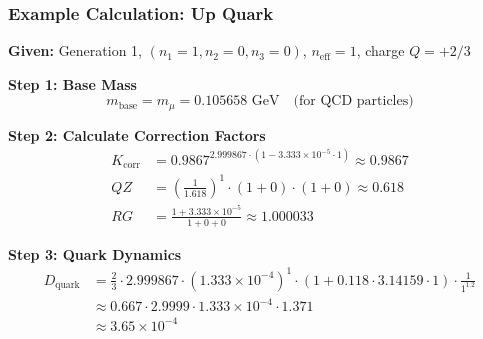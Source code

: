 	\begin{table}[h]
		\centering
		\small
		\caption{Quantum numbers systematics in the fractal method}
		\label{tab:qn_fractal}
	\end{table}
	
	\subsubsection{Example Calculation: Up Quark}
	
	\textbf{Given:} Generation 1, $(n_1=1, n_2=0, n_3=0)$, $n_{\text{eff}}=1$, charge $Q=+2/3$
	
	\textbf{Step 1: Base Mass}
	\begin{equation}
		m_{\text{base}} = m_\mu = 0.105658 \text{ GeV} \quad \text{(for QCD particles)}
	\end{equation}
	
	\textbf{Step 2: Calculate Correction Factors}
	\begin{align}
		K_{\text{corr}} &= 0.9867^{2.999867 \cdot (1 - 3.333 \times 10^{-5} \cdot 1)} \approx 0.9867 \\
		QZ &= \left(\frac{1}{1.618}\right)^1 \cdot (1 + 0) \cdot (1 + 0) \approx 0.618 \\
		RG &= \frac{1 + 3.333 \times 10^{-5}}{1 + 0 + 0} \approx 1.000033
	\end{align}
	
	\textbf{Step 3: Quark Dynamics}
	\begin{align}
		D_{\text{quark}} &= \frac{2}{3} \cdot 2.999867 \cdot (1.333 \times 10^{-4})^1 \cdot (1 + 0.118 \cdot 3.14159 \cdot 1) \cdot \frac{1}{1^{1.2}} \\
		&\approx 0.667 \cdot 2.9999 \cdot 1.333 \times 10^{-4} \cdot 1.371 \\
		&\approx 3.65 \times 10^{-4}
	\end{align}
	
